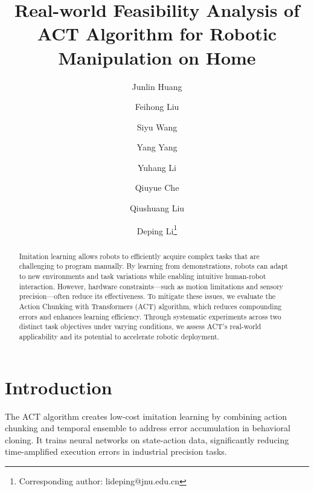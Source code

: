 \documentclass[runningheads]{llncs}
\begin{document}
\title{Real-world Feasibility Analysis of ACT Algorithm for Robotic Manipulation on Home}

\author{
  Junlin Huang \and
  Feihong Liu \and
  Siyu Wang \and
  Yang Yang \and
  Yuhang Li \and
  Qiuyue Che \and
  Qiushuang Liu \and
  Deping Li\thanks{Corresponding author: lideping@jnu.edu.cn}
}





\maketitle




%
\begin{abstract}
Imitation learning allows robots to efficiently acquire complex tasks that are challenging to program manually. By learning from demonstrations, robots can adapt to new environments and task variations while enabling intuitive human-robot interaction. However, hardware constraints—such as motion limitations and sensory precision—often reduce its effectiveness. To mitigate these issues, we evaluate the Action Chunking with Transformers (ACT) algorithm, which reduces compounding errors and enhances learning efficiency. Through systematic experiments across two distinct task objectives under varying conditions, we assess ACT’s real-world applicability and its potential to accelerate robotic deployment.


\end{abstract}
%
%
%
\section{Introduction}
The ACT algorithm creates low-cost imitation learning by combining action chunking and temporal ensemble to address error accumulation in behavioral cloning. It trains neural networks on state-action data, significantly reducing time-amplified execution errors in industrial precision tasks. 
 
\end{document}
